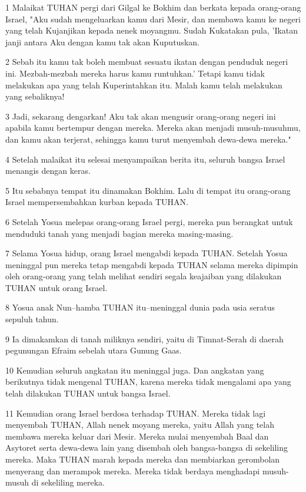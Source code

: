 \par 1 Malaikat TUHAN pergi dari Gilgal ke Bokhim dan berkata kepada orang-orang Israel, "Aku sudah mengeluarkan kamu dari Mesir, dan membawa kamu ke negeri yang telah Kujanjikan kepada nenek moyangmu. Sudah Kukatakan pula, 'Ikatan janji antara Aku dengan kamu tak akan Kuputuskan.
\par 2 Sebab itu kamu tak boleh membuat sesuatu ikatan dengan penduduk negeri ini. Mezbah-mezbah mereka harus kamu runtuhkan.' Tetapi kamu tidak melakukan apa yang telah Kuperintahkan itu. Malah kamu telah melakukan yang sebaliknya!
\par 3 Jadi, sekarang dengarkan! Aku tak akan mengusir orang-orang negeri ini apabila kamu bertempur dengan mereka. Mereka akan menjadi musuh-musuhmu, dan kamu akan terjerat, sehingga kamu turut menyembah dewa-dewa mereka."
\par 4 Setelah malaikat itu selesai menyampaikan berita itu, seluruh bangsa Israel menangis dengan keras.
\par 5 Itu sebabnya tempat itu dinamakan Bokhim. Lalu di tempat itu orang-orang Israel mempersembahkan kurban kepada TUHAN.
\par 6 Setelah Yosua melepas orang-orang Israel pergi, mereka pun berangkat untuk menduduki tanah yang menjadi bagian mereka masing-masing.
\par 7 Selama Yosua hidup, orang Israel mengabdi kepada TUHAN. Setelah Yosua meninggal pun mereka tetap mengabdi kepada TUHAN selama mereka dipimpin oleh orang-orang yang telah melihat sendiri segala keajaiban yang dilakukan TUHAN untuk orang Israel.
\par 8 Yosua anak Nun--hamba TUHAN itu--meninggal dunia pada usia seratus sepuluh tahun.
\par 9 Ia dimakamkan di tanah miliknya sendiri, yaitu di Timnat-Serah di daerah pegunungan Efraim sebelah utara Gunung Gaas.
\par 10 Kemudian seluruh angkatan itu meninggal juga. Dan angkatan yang berikutnya tidak mengenal TUHAN, karena mereka tidak mengalami apa yang telah dilakukan TUHAN untuk bangsa Israel.
\par 11 Kemudian orang Israel berdosa terhadap TUHAN. Mereka tidak lagi menyembah TUHAN, Allah nenek moyang mereka, yaitu Allah yang telah membawa mereka keluar dari Mesir. Mereka mulai menyembah Baal dan Asytoret serta dewa-dewa lain yang disembah oleh bangsa-bangsa di sekeliling mereka. Maka TUHAN marah kepada mereka dan membiarkan gerombolan menyerang dan merampok mereka. Mereka tidak berdaya menghadapi musuh-musuh di sekeliling mereka.
